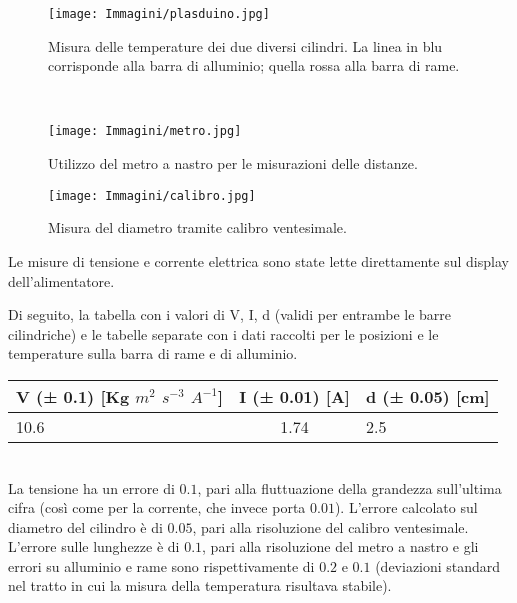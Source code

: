 \documentclass{article}
\begin{document}
\begin{figure}
\begin{minipage}[b]{8.5cm}
\centering
\texttt{[image: Immagini/plasduino.jpg]}
\caption{Misura delle temperature dei due diversi cilindri. La linea in blu corrisponde alla barra di alluminio; quella rossa alla barra di rame.}
\end{minipage}
\ \hspace{2mm} \hspace{3mm} \
\begin{minipage}[b]{8.5cm}
\centering
\texttt{[image: Immagini/metro.jpg]}
\caption{Utilizzo del metro a nastro per le misurazioni delle distanze.
\\}
\end{minipage}
\end{figure}

\FloatBarrier

\begin{figure} [h]
    \centering
    \texttt{[image: Immagini/calibro.jpg]}
    \caption{Misura del diametro tramite calibro ventesimale.}
    \label{fig:my_label}
\end{figure}

\FloatBarrier

Le misure di tensione e corrente elettrica sono state lette direttamente sul display dell'alimentatore.

\noindent Di seguito, la tabella con i valori di V, I, d (validi per entrambe le barre cilindriche) e le tabelle separate con i dati raccolti per le posizioni e le temperature sulla barra di rame e di alluminio.

\begin{center}
\begin{tabular}{lcl}
    \toprule
    V (± 0.1) [Kg $m^{2}$ $s^{-3}$ $A^{-1}$]  & I (± 0.01) [A] & d (± 0.05) [cm] \\
    \midrule
    10.6 & 1.74 & 2.5 \\ 
    \bottomrule
\end{tabular}
\end{center}
\\
La tensione ha un errore di $0.1$, pari alla fluttuazione della grandezza sull'ultima cifra (così come per la corrente, che invece porta $0.01$). L'errore calcolato sul diametro del cilindro è di $0.05$, pari alla risoluzione del calibro ventesimale. L'errore sulle lunghezze è di $0.1$, pari alla risoluzione del metro a nastro e gli errori su alluminio e rame sono rispettivamente di $0.2$ e $0.1$ (deviazioni standard nel tratto in cui la misura della temperatura risultava stabile).
\end{document}
